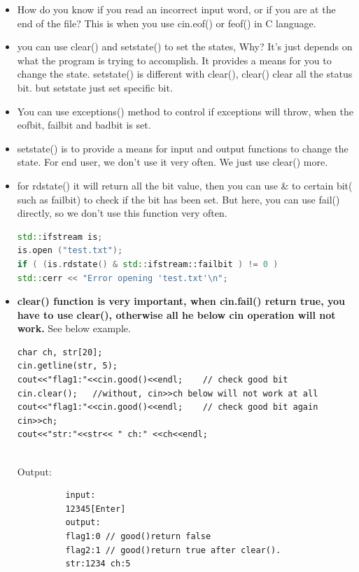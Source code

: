 \documentclass[a4paper,11pt,twoside]{book}
\begin{document}
\begin{itemize}
	\item How do you know if you read an incorrect input word, or if you are at the end of the file? This is when you use cin.eof() or feof() in C language.
	
	
	\item you can use clear() and setstate() to set the states, Why? It's just depends on what the program is trying to accomplish.  It provides a means for you to change the state. setstate() is different with clear(), clear() clear all the status bit. but setstate just set specific bit.
	
	\item You can use exceptions() method to control if exceptions will throw, when the eofbit, failbit and badbit is set.
	
	\item setstate() is to provide a means for input and output functions to change the state. For end user, we don't use it very often. We just use clear() more.
	
	\item for rdstate() it will return all the bit value, then you can use \& to certain bit( such as failbit) to check if the bit has been set. But here, you can use fail() directly, so we don't use this function very often.
\begin{lstlisting}[frame=single, language=c++]
std::ifstream is;
is.open ("test.txt");
if ( (is.rdstate() & std::ifstream::failbit ) != 0 )
std::cerr << "Error opening 'test.txt'\n";
\end{lstlisting}
	
	
	\item \textbf{clear() function is very important, when cin.fail() return true, you have to use clear(), otherwise all he below cin operation will not work.} See below example.
	
\begin{lstlisting}[numbers=none]
char ch, str[20];
cin.getline(str, 5);
cout<<"flag1:"<<cin.good()<<endl;    // check good bit
cin.clear();   //without, cin>>ch below will not work at all
cout<<"flag1:"<<cin.good()<<endl;    // check good bit again
cin>>ch;
cout<<"str:"<<str<< " ch:" <<ch<<endl;
	

\end{lstlisting}
\begin{description}
	\item[Output:] 
	\begin{verbatim}
	input:
	12345[Enter]
	output:
	flag1:0 // good()return false
	flag2:1 // good()return true after clear().
	str:1234 ch:5
	\end{verbatim}
\end{description}
	
\end{itemize}
\end{document}
